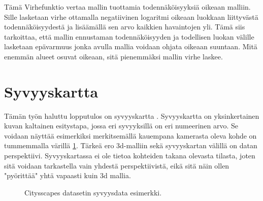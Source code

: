 Tämä Virhefunktio vertaa mallin tuottamia todennäköisyyksiä oikeaan malliin. 
Sille lasketaan virhe ottamalla negatiivinen logaritmi oikeaan luokkaan liittyvästä todennäköisyydestä ja lisäämällä sen arvo kaikkien havaintojen yli.
Tämä siis tarkoittaa, että mallin ennustaman todennäköisyyden ja todellisen luokan välille lasketaan epävarmuus jonka avulla mallia voidaan ohjata oikeaan suuntaan.
Mitä enemmän alueet osuvat oikeaan, sitä pienemmäksi mallin virhe laskee.

\section{Syvyyskartta}

Tämän työn haluttu lopputulos on syvyyskartta \cite{IkeuchiKatsushi1987DaDM}.
Syvyyskartta on yksinkertainen kuvan kaltainen esitystapa, jossa eri syvyyksillä on eri numeerinen arvo.
Se voidaan näyttää esimerkiksi merkitsemällä kauempana kamerasta oleva kohde on tummemmalla värillä \ref{fig:depth}.
Tärkeä ero 3d-malliin sekä syvyyskartan välillä on datan perspektiivi.
Syvyyskartassa ei ole tietoa kohteiden takana olevasta tilasta, joten sitä voidaan tarkastella vain yhdestä perspektiivistä, eikä sitä näin ollen "pyörittää" yhtä vapaasti kuin 3d mallia.


\begin{figure}[h]
\centering
{}
\caption[Tämä on lyhyt kuvateksti.]{Citysscapes datasetin syvyysdata esimerkki.}
\label{fig:depth}
\end{figure}

